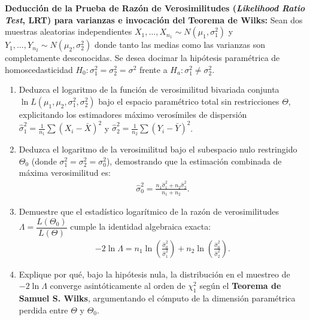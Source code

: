 \begin{problema}
	\label{prob:doc_desaf_lrt_wilks}
	\textbf{Deducción de la Prueba de Razón de Verosimilitudes (\emph{Likelihood Ratio Test}, LRT) para varianzas e invocación del Teorema de Wilks:}
	Sean dos muestras aleatorias independientes $X_1, \dots, X_{n_1} \sim N(\mu_1, \sigma_1^2)$ y $Y_1, \dots, Y_{n_2} \sim N(\mu_2, \sigma_2^2)$ donde tanto las medias como las varianzas son completamente desconocidas. Se desea docimar la hipótesis paramétrica de homoscedasticidad $H_0: \sigma_1^2 = \sigma_2^2 = \sigma^2$ frente a $H_a: \sigma_1^2 \neq \sigma_2^2$.
	\begin{enumerate}
		\item Deduzca el logaritmo de la función de verosimilitud bivariada conjunta $\ln L(\mu_1, \mu_2, \sigma_1^2, \sigma_2^2)$ bajo el espacio paramétrico total sin restricciones $\Theta$, explicitando los estimadores máximo verosímiles de dispersión $\hat{\sigma}_1^2 = \frac{1}{n_1}\sum (X_i - \bar{X})^2$ y $\hat{\sigma}_2^2 = \frac{1}{n_2}\sum (Y_i - \bar{Y})^2$.
		\item Deduzca el logaritmo de la verosimilitud bajo el subespacio nulo restringido $\Theta_0$ (donde $\sigma_1^2 = \sigma_2^2 = \sigma_0^2$), demostrando que la estimación combinada de máxima verosimilitud es:
		\begin{align}
			\hat{\sigma}_0^2 = \frac{n_1 \hat{\sigma}_1^2 + n_2 \hat{\sigma}_2^2}{n_1 + n_2}.
		\end{align}
		\item Demuestre que el estadístico logarítmico de la razón de verosimilitudes $\Lambda = \dfrac{L(\Theta_0)}{L(\Theta)}$ cumple la identidad algebraica exacta:
		\begin{align}
			-2 \ln \Lambda = n_1 \ln\left( \frac{\hat{\sigma}_0^2}{\hat{\sigma}_1^2} \right) + n_2 \ln\left( \frac{\hat{\sigma}_0^2}{\hat{\sigma}_2^2} \right).
		\end{align}
		\item Explique por qué, bajo la hipótesis nula, la distribución en el muestreo de $-2 \ln \Lambda$ converge asintóticamente al orden de $\chi^2_1$ según el \textbf{Teorema de Samuel S. Wilks}, argumentando el cómputo de la dimensión paramétrica perdida entre $\Theta$ y $\Theta_0$.
	\end{enumerate}
\end{problema}

